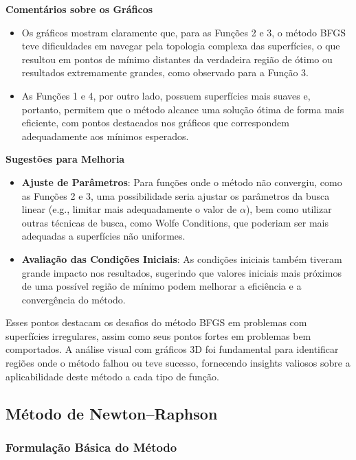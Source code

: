 \documentclass[a4paper, 12pt]{article}
\begin{document}
\textbf{Comentários sobre os Gráficos}

\begin{itemize}
    \item Os gráficos mostram claramente que, para as Funções 2 e 3, o método BFGS teve dificuldades em navegar pela topologia complexa das superfícies, o que resultou em pontos de mínimo distantes da verdadeira região de ótimo ou resultados extremamente grandes, como observado para a Função 3.
    \item As Funções 1 e 4, por outro lado, possuem superfícies mais suaves e, portanto, permitem que o método alcance uma solução ótima de forma mais eficiente, com pontos destacados nos gráficos que correspondem adequadamente aos mínimos esperados.
\end{itemize}

\textbf{Sugestões para Melhoria}

\begin{itemize}
    \item \textbf{Ajuste de Parâmetros}: Para funções onde o método não convergiu, como as Funções 2 e 3, uma possibilidade seria ajustar os parâmetros da busca linear (e.g., limitar mais adequadamente o valor de \(\alpha\)), bem como utilizar outras técnicas de busca, como Wolfe Conditions, que poderiam ser mais adequadas a superfícies não uniformes.

    \item \textbf{Avaliação das Condições Iniciais}: As condições iniciais também tiveram grande impacto nos resultados, sugerindo que valores iniciais mais próximos de uma possível região de mínimo podem melhorar a eficiência e a convergência do método.

\end{itemize}

Esses pontos destacam os desafios do método BFGS em problemas com superfícies irregulares, assim como seus pontos fortes em problemas bem comportados. A análise visual com gráficos 3D foi fundamental para identificar regiões onde o método falhou ou teve sucesso, fornecendo insights valiosos sobre a aplicabilidade deste método a cada tipo de função.




\newpage
\subsection{Método de Newton–Raphson}

\subsubsection{Formulação Básica do Método}
\end{document}
